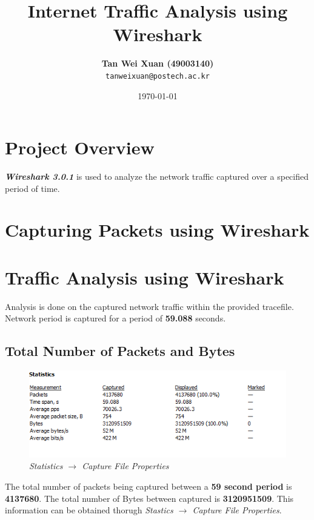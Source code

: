 \documentclass[a4paper,11pt]{article}
\begin{document}
\title{\vspace{-1.0cm}\textbf{Internet Traffic Analysis using Wireshark}}
\author{
  \textbf{Tan Wei Xuan (49003140)}\\
  \texttt{tanweixuan@postech.ac.kr}
}
\date{\today}
\maketitle

\section{Project Overview}
\textit{\textbf{Wireshark 3.0.1}} is used to analyze the network traffic captured over a specified period of time.

\section{Capturing Packets using Wireshark}

\section{Traffic Analysis using Wireshark}
Analysis is done on the captured network traffic within the provided tracefile. Network period is captured for a period of \textbf{59.088} seconds.

\subsection{Total Number of Packets and Bytes}
\begin{figure}[h!]
	\includegraphics{TtlNoPacketsBytes}
	\caption{\textit{Statistics $\rightarrow$ Capture File Properties}}
\end{figure}
The total number of packets being captured between a \textbf{59 second period} is \textbf{4137680}. The total number of Bytes between captured is \textbf{3120951509}. This information can be obtained thorugh \textit{Stastics $\rightarrow$ Capture File Properties}.
\end{document}

